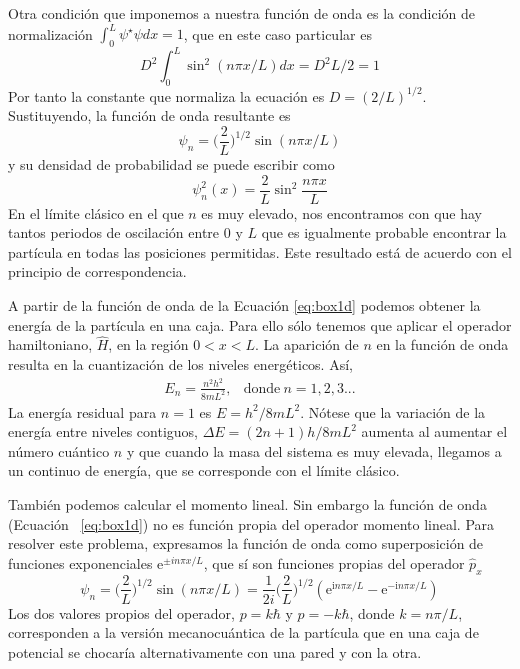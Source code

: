 Otra condición que imponemos a nuestra función de onda es la
condición de normalización 
$\int_0^L\psi^\star \psi dx = 1$, 
que en este caso particular es
\begin{equation}
        D^2\int_0^L\sin^2 (n\pi x/L) dx = D^2L/2= 1
\end{equation}
Por tanto la constante que normaliza la ecuación es
$D=(2/L)^{1/2}$. Sustituyendo, la función de onda
resultante es
\begin{equation}
    \psi_n=\bigg(\frac{2}{L}\bigg)^{1/2}\sin(n\pi x/L)
    \label{eq:box1d}
\end{equation}
y su densidad de probabilidad se puede escribir como
\begin{equation}
    \psi^2_n(x)=\frac{2}{L}\sin^2\frac{n\pi x}{L}
\end{equation}
En el límite clásico en el que $n$ es muy elevado, nos 
encontramos con que hay tantos periodos de oscilación 
entre 0 y $L$ que es igualmente probable encontrar la 
partícula en todas las posiciones permitidas. Este 
resultado está de acuerdo con el principio de 
correspondencia.

A partir de la función de onda de la Ecuación \ref{eq:box1d}
podemos obtener la energía de la partícula en una caja. Para
ello sólo tenemos que aplicar el operador hamiltoniano, 
$\hat{H}$, en la región $0< x<L$. La aparición de $n$ en
la función de onda resulta en la cuantización de los 
niveles energéticos. Así,
\begin{equation}
    \begin{array}{lr}
        E_n =\frac{n^2h^2}{8mL^2},& \mathrm{ donde~}n=1,2,3...
    \end{array}
\end{equation}
La energía residual para $n=1$ es $E=h^2/8mL^2$. 
Nótese que la variación de la energía entre niveles
contiguos, $\Delta E=(2n+1)h/8mL^2$ aumenta al aumentar el
número cuántico $n$ y que cuando la masa del sistema es muy
elevada, llegamos a un continuo de energía, que se
corresponde con el límite clásico.

También podemos calcular el momento lineal. Sin embargo la 
función de onda (Ecuación ~\ref{eq:box1d}) no es función
propia del operador momento lineal. Para resolver este
problema, expresamos la función de onda como superposición
de funciones exponenciales $\mathrm{e}^{\pm in\pi x/L}$, 
que sí son funciones propias del operador $\hat{p}_x$
\begin{equation}
    \psi_n=\bigg(\frac{2}{L}\bigg)^{1/2}\sin(n\pi x/L)=
    \frac{1}{2i}\bigg(\frac{2}{L}\bigg)^{1/2}(\mathrm{e}^{\mathrm{i}n\pi x/L} - \mathrm{e}^{-\mathrm{i}n\pi x/L})
\end{equation}
Los dos valores propios del operador, $p=k\hbar$ y 
$p=-k\hbar$, donde $k=n\pi/L$, corresponden a la versión mecanocuántica de 
la partícula que en una caja de potencial se chocaría
alternativamente con una pared y con la otra.

